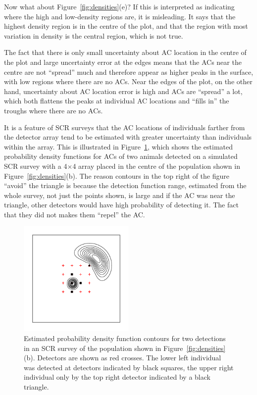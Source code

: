 \documentclass[useAMS,usenatbib,referee]{biom}
\begin{document}
Now what about Figure~\ref{fig:densities}(e)? If this is interpreted as indicating where the high and low-density regions are, it is misleading. It says that the highest density region is in the centre of the plot, and that the region with most variation in density is the central region, which is not true. 

The fact that there is only small uncertainty about AC location in the centre of the plot and large uncertainty error at the edges means that the ACs near the centre are not ``spread'' much and therefore appear as higher peaks in the surface, with low regions where there are no ACs. Near the edges of the plot, on the other hand, uncertainty about AC location error is high and ACs are ``spread'' a lot, which both flattens the peaks at individual AC locations and ``fills in'' the troughs where there are no ACs. 

It is a feature of SCR surveys that the AC locations of individuals farther from the detector array tend to be estimated with greater uncertainty than individuals within the array. This is illustrated in Figure~\ref{fig:screrr}, which shows the estimated probability density functions for ACs of two animals detected on a simulated SCR survey with a 4$\times$4 array placed in the centre of the population shown in Figure~\ref{fig:densities}(b). The reason contours in the top right of the figure ``avoid'' the triangle is because the detection function range, estimated from the whole survey, not just the points shown, is large and if the AC was near the triangle, other detectors would have high probability of detecting it. The fact that they did not makes them ``repel'' the AC. 

\begin{figure}[htbp]
\centering
\includegraphics[width=0.5\textwidth]{screrr.pdf}
\caption{Estimated probability density function contours for two detections in an SCR survey of the population shown in Figure~\ref{fig:densities}(b). Detectors are shown as red crosses. The lower left individual was detected at detectors indicated by black squares, the upper right individual only by the top right detector indicated by a black triangle.}
\label{fig:screrr}
\end{figure}
\end{document}
